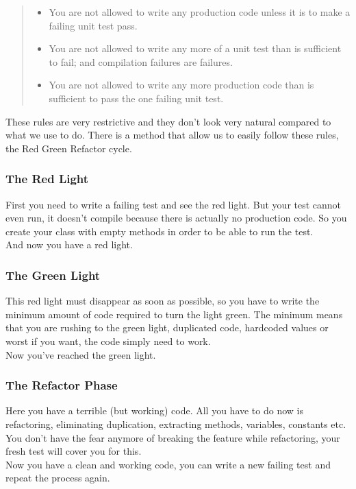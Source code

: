 \begin{quote}
\begin{itemize}
\item You are not allowed to write any production code unless it is to
make a failing unit test pass.
\item You are not allowed to write any more of a unit test than is
sufficient to fail;
and compilation failures are failures.
\item You are not allowed to write any more production code than is
sufficient
to pass the one failing unit test.
\end{itemize}
\end{quote}

These rules are very restrictive and they don't look very natural
compared to what we use to do.
There is a method that allow us to easily follow these rules, the
Red Green Refactor cycle.
\subsubsection{The Red Light}
First you need to write a failing test and see the red light.
But your test cannot even run, it doesn't compile because there is
actually no production code.
So you create your class with empty methods in order to be able to run
the test. \\
And now you have a red light.
\subsubsection{The Green Light}
This red light must disappear as soon as possible, so you have to write
the minimum amount of code required to turn the light green.
The minimum means that you are rushing to the green light, duplicated
code, hardcoded values or worst if you want, the code simply need to
work. \\
Now you've reached the green light.
\subsubsection{The Refactor Phase}
Here you have a terrible (but working) code.
All you have to do now is refactoring, eliminating duplication,
extracting methods, variables, constants etc.
You don't have the fear anymore of breaking the feature while
refactoring, your fresh test will cover you for this. \\
Now you have a clean and working code, you can write a new failing test
and repeat the process again.
